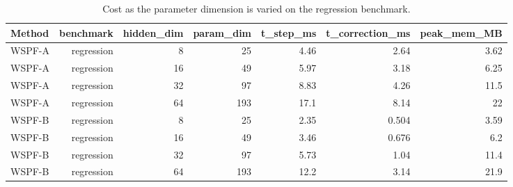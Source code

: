\begin{table}[htbp]
\centering
\footnotesize
\setlength{\tabcolsep}{3pt}
\caption{Cost as the parameter dimension is varied on the regression benchmark.}
\label{tab:s9b_dim_sweep}
\begin{tabular}{@{}lrrrrrr@{}}
\toprule
Method & benchmark & hidden\_dim & param\_dim & t\_step\_ms & t\_correction\_ms & peak\_mem\_MB \\
\midrule
WSPF-A & regression & 8 & 25 & 4.46 & 2.64 & 3.62 \\
WSPF-A & regression & 16 & 49 & 5.97 & 3.18 & 6.25 \\
WSPF-A & regression & 32 & 97 & 8.83 & 4.26 & 11.5 \\
WSPF-A & regression & 64 & 193 & 17.1 & 8.14 & 22 \\
WSPF-B & regression & 8 & 25 & 2.35 & 0.504 & 3.59 \\
WSPF-B & regression & 16 & 49 & 3.46 & 0.676 & 6.2 \\
WSPF-B & regression & 32 & 97 & 5.73 & 1.04 & 11.4 \\
WSPF-B & regression & 64 & 193 & 12.2 & 3.14 & 21.9 \\
\bottomrule
\end{tabular}
\end{table}
